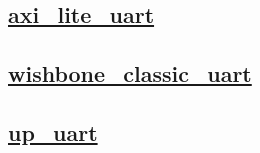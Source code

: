 \documentclass{article}
\begin{document}
  


  \subsection{\href{../files/axi_lite_uart-v.html}{axi\_lite\_uart}}

  \subsection{\href{../files/wishbone_classic_uart-v.html}{wishbone\_classic\_uart}}

  \subsection{\href{../files/up_uart-v.html}{up\_uart}}
\end{document}
